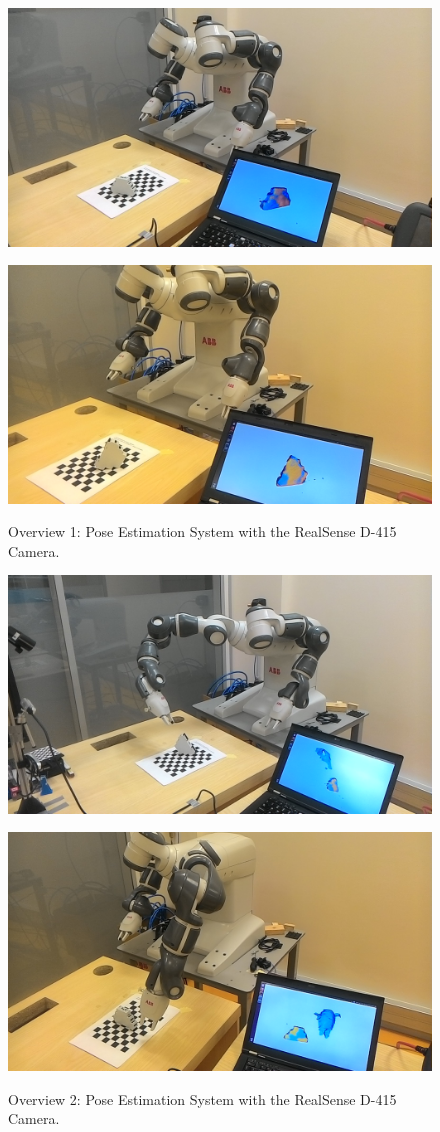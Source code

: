 \begin{figure}[htp]
\begin{center}
{
  \includegraphics[clip,width=0.7\columnwidth]{realnew/2.jpg}
}
\end{center}
\begin{center}
{
  \includegraphics[clip,width=0.7\columnwidth]{realnew/3.jpg}
}
\end{center}

\caption{Overview 1: Pose Estimation System with the RealSense D-415 Camera.}
\label{mami1}
\end{figure}


\begin{figure}[htp]
\begin{center}
{
  \includegraphics[clip,width=0.7\columnwidth]{realnew/5.jpg}
}
\end{center}
\begin{center}
{
  \includegraphics[clip,width=0.7\columnwidth]{realnew/4.jpg}
}
\end{center}


\caption{Overview 2: Pose Estimation System with the RealSense D-415 Camera.}
\label{mami2}
\end{figure}